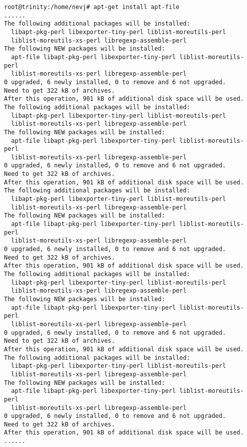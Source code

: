\documentclass[a4paper]{article}  %
\begin{document}
\begin{tcolorbox}
\begin{verbatim}
root@trinity:/home/nevj# apt-get install apt-file
......
The following additional packages will be installed:
  libapt-pkg-perl libexporter-tiny-perl liblist-moreutils-perl
  liblist-moreutils-xs-perl libregexp-assemble-perl
The following NEW packages will be installed:
  apt-file libapt-pkg-perl libexporter-tiny-perl liblist-moreutils-perl
  liblist-moreutils-xs-perl libregexp-assemble-perl
0 upgraded, 6 newly installed, 0 to remove and 6 not upgraded.
Need to get 322 kB of archives.
After this operation, 901 kB of additional disk space will be used.
The following additional packages will be installed:
  libapt-pkg-perl libexporter-tiny-perl liblist-moreutils-perl
  liblist-moreutils-xs-perl libregexp-assemble-perl
The following NEW packages will be installed:
  apt-file libapt-pkg-perl libexporter-tiny-perl liblist-moreutils-perl
  liblist-moreutils-xs-perl libregexp-assemble-perl
0 upgraded, 6 newly installed, 0 to remove and 6 not upgraded.
Need to get 322 kB of archives.
After this operation, 901 kB of additional disk space will be used.
The following additional packages will be installed:
  libapt-pkg-perl libexporter-tiny-perl liblist-moreutils-perl
  liblist-moreutils-xs-perl libregexp-assemble-perl
The following NEW packages will be installed:
  apt-file libapt-pkg-perl libexporter-tiny-perl liblist-moreutils-perl
  liblist-moreutils-xs-perl libregexp-assemble-perl
0 upgraded, 6 newly installed, 0 to remove and 6 not upgraded.
Need to get 322 kB of archives.
After this operation, 901 kB of additional disk space will be used.
The following additional packages will be installed:
  libapt-pkg-perl libexporter-tiny-perl liblist-moreutils-perl
  liblist-moreutils-xs-perl libregexp-assemble-perl
The following NEW packages will be installed:
  apt-file libapt-pkg-perl libexporter-tiny-perl liblist-moreutils-perl
  liblist-moreutils-xs-perl libregexp-assemble-perl
0 upgraded, 6 newly installed, 0 to remove and 6 not upgraded.
Need to get 322 kB of archives.
After this operation, 901 kB of additional disk space will be used.
The following additional packages will be installed:
  libapt-pkg-perl libexporter-tiny-perl liblist-moreutils-perl
  liblist-moreutils-xs-perl libregexp-assemble-perl
The following NEW packages will be installed:
  apt-file libapt-pkg-perl libexporter-tiny-perl liblist-moreutils-perl
  liblist-moreutils-xs-perl libregexp-assemble-perl
0 upgraded, 6 newly installed, 0 to remove and 6 not upgraded.
Need to get 322 kB of archives.
After this operation, 901 kB of additional disk space will be used.
......
\end{verbatim}
\end{tcolorbox}
\end{document}
